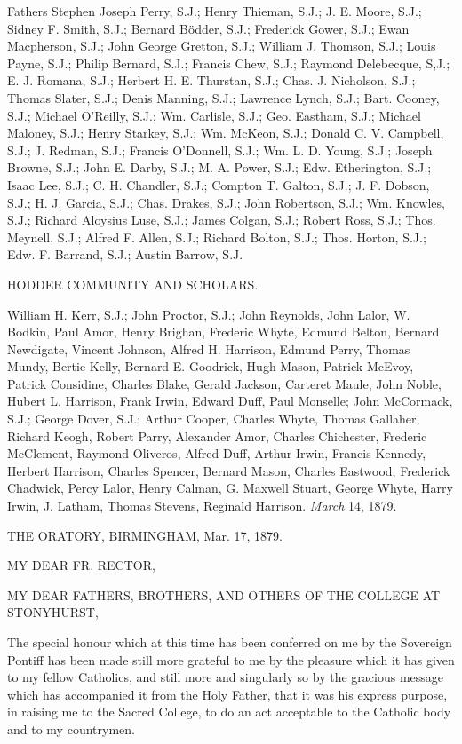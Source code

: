 Fathers Stephen Joseph Perry, S.J.; Henry Thieman,
S.J.; J. E. Moore, S.J.; Sidney F. Smith, S.J.; Bernard Bödder, S.J.;
Frederick Gower, S.J.; Ewan Macpherson, S.J.; John George Gretton, S.J.;
William J. Thomson, S.J.; Louis Payne, S.J.; Philip Bernard, S.J.;
Francis Chew, S.J.; Raymond Delebecque, S,J.; E. J. Romana, S.J.;
Herbert H. E. Thurstan, S.J.; Chas. J. Nicholson, S.J.; Thomas Slater,
S.J.; Denis Manning, S.J.; Lawrence Lynch, S.J.; Bart. Cooney, S.J.;
Michael O'Reilly, S.J.; Wm. Carlisle, S.J.; Geo. Eastham, S.J.;
Michael Maloney, S.J.; Henry Starkey, S.J.; Wm. McKeon, S.J.; Donald
C. V. Campbell, S.J.; J. Redman, S.J.; Francis O'Donnell, S.J.; Wm. L.
D. Young, S.J.; Joseph Browne, S.J.; John E. Darby, S.J.; M. A. Power,
S.J.; Edw. Etherington, S.J.; Isaac Lee, S.J.; C. H. Chandler, S.J.;
Compton T. Galton, S.J.; J. F. Dobson, S.J.; H. J. Garcia, S.J.; Chas.
Drakes, S.J.; John Robertson, S.J.; Wm. Knowles, S.J.; Richard
Aloysius Luse, S.J.; James Colgan, S.J.; Robert Ross, S.J.; Thos.
Meynell, S.J.; Alfred F. Allen, S.J.; Richard Bolton, S.J.; Thos.
Horton, S.J.; Edw. F. Barrand, S.J.; Austin Barrow, S.J.

HODDER COMMUNITY AND SCHOLARS.

William H. Kerr, S.J.; John Proctor, S.J.; John
Reynolds, John Lalor, W. Bodkin, Paul Amor, Henry Brighan, Frederic
Whyte, Edmund Belton, Bernard Newdigate, Vincent Johnson, Alfred H.
Harrison, Edmund Perry, Thomas Mundy, Bertie Kelly, Bernard E.
Goodrick, Hugh Mason, Patrick McEvoy, Patrick Considine, Charles
Blake, Gerald Jackson, Carteret Maule, John Noble, Hubert L. Harrison,
Frank Irwin, Edward Duff, Paul Monselle; John McCormack, S.J.; George
Dover, S.J.; Arthur Cooper, Charles Whyte, Thomas Gallaher, Richard
Keogh, Robert Parry, Alexander Amor, Charles Chichester, Frederic
McClement, Raymond Oliveros, Alfred Duff, Arthur Irwin, Francis
Kennedy, Herbert Harrison, Charles Spencer, Bernard Mason, Charles
Eastwood, Frederick Chadwick, Percy Lalor, Henry Calman, G. Maxwell
Stuart, George Whyte, Harry Irwin, J. Latham, Thomas Stevens, Reginald
Harrison.
\emph{March} 14, 1879.


THE ORATORY, BIRMINGHAM,
Mar. 17, 1879.

MY DEAR FR.
RECTOR,

MY DEAR FATHERS,
BROTHERS, AND OTHERS
OF THE COLLEGE
AT STONYHURST,

The special honour which at this time has been conferred on me by the
Sovereign Pontiff has been made still more grateful to me by the
pleasure which it has given to my fellow Catholics, and still more and
singularly so by the gracious message which has accompanied it from
the Holy Father, that it was his express purpose, in raising me to the
Sacred College, to do an act acceptable to the Catholic body and to my
countrymen.

